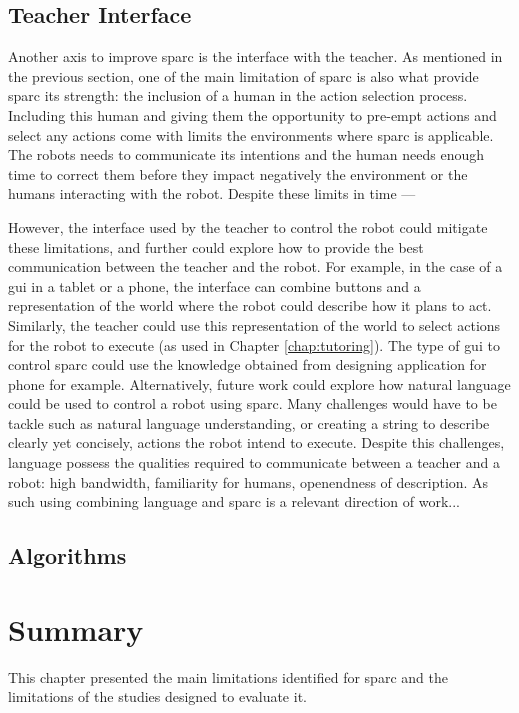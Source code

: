 \subsection{Teacher Interface}

Another axis to improve \gls{sparc} is the interface with the teacher. As mentioned in the previous section, one of the main limitation of \gls{sparc} is also what provide \gls{sparc} its strength: the inclusion of a human in the action selection process. Including this human and giving them the opportunity to pre-empt actions and select any actions come with limits the environments where \gls{sparc} is applicable. The robots needs to communicate its intentions and the human needs enough time to correct them before they impact negatively the environment or the humans interacting with the robot. Despite these limits in time ---

However, the interface used by the teacher to control the robot could mitigate these limitations, and further could explore how to provide the best communication between the teacher and the robot. For example, in the case of a \gls{gui} in a tablet or a phone, the interface can combine buttons and a representation of the world where the robot could describe how it plans to act. Similarly, the teacher could use this representation of the world to select actions for the robot to execute (as used in Chapter \ref{chap:tutoring}). The type of \gls{gui} to control \gls{sparc} could use the knowledge obtained from designing application for phone for example. Alternatively, future work could explore how natural language could be used to control a robot using \gls{sparc}. Many challenges would have to be tackle such as natural language understanding, or creating a string to describe clearly yet concisely, actions the robot intend to execute. Despite this challenges, language possess the qualities required to communicate between a teacher and a robot: high bandwidth, familiarity for humans, openendness of description. As such using combining language and \gls{sparc} is a relevant direction of work...

\subsection{Algorithms}

\section{Summary} \label{sec:disc_summary}

This chapter presented the main limitations identified for \gls{sparc} and the limitations of the studies designed to evaluate it.